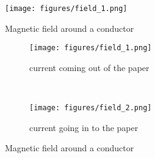 \begin{figure}[hb]
    \centering
	\texttt{[image: figures/field\_1.png]}
	\caption{Magnetic field around a conductor}
	\label{fig:example-fig-1}
\end{figure}

\begin{figure}[hb]
    \centering
    
    \begin{subfigure}[t]{0.4\textwidth}
    \centering
    \texttt{[image: figures/field\_1.png]}
    \caption{current coming out of the paper}
    \end{subfigure}
    ~ %
    \begin{subfigure}[t]{0.4\textwidth}
    \centering
    \texttt{[image: figures/field\_2.png]}
    \caption{current going in to the paper}
    \end{subfigure}

    \caption{Magnetic field around a conductor}
    \label{fig:example-fig-2}
    
\end{figure}